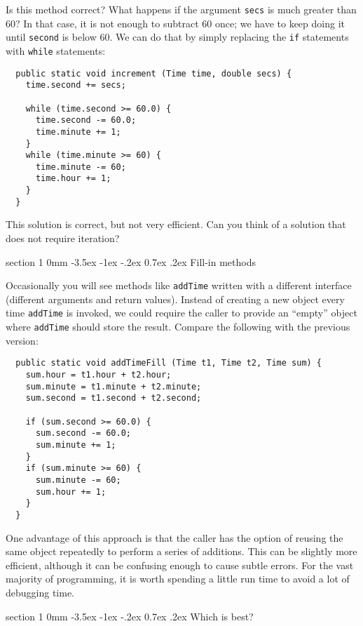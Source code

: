 \documentclass{book}
\makeatletter
\renewcommand{\section}{\@startsection 
    {section} {1} {0mm}%
    {-3.5ex \@plus -1ex \@minus -.2ex}%
    {0.7ex \@plus.2ex}%
    {\normalfont\Large\bfseries}}
\makeatother
\begin{document}
Is this method correct?  What happens if the argument {\tt secs}
is much greater than 60?  In that case, it is not enough to
subtract 60 once; we have to keep doing it until {\tt second}
is below 60.  We can do that by simply replacing the {\tt if}
statements with {\tt while} statements:

\begin{verbatim}
  public static void increment (Time time, double secs) {
    time.second += secs;

    while (time.second >= 60.0) {
      time.second -= 60.0;
      time.minute += 1;
    }
    while (time.minute >= 60) {
      time.minute -= 60;
      time.hour += 1;
    }
  }
\end{verbatim}
%
This solution is correct, but not very efficient.
Can you think of a solution that does not require iteration?

\section{Fill-in methods}

Occasionally you will see methods like {\tt addTime} written
with a different interface (different arguments and return values).
Instead of creating a new object every time {\tt addTime} is
invoked, we could require the caller to provide an ``empty''
object where {\tt addTime} should store the result.  Compare
the following with the previous version:

\begin{verbatim}
  public static void addTimeFill (Time t1, Time t2, Time sum) {
    sum.hour = t1.hour + t2.hour;
    sum.minute = t1.minute + t2.minute;
    sum.second = t1.second + t2.second;

    if (sum.second >= 60.0) {
      sum.second -= 60.0;
      sum.minute += 1;
    }
    if (sum.minute >= 60) {
      sum.minute -= 60;
      sum.hour += 1;
    }
  }
\end{verbatim}
%
One advantage of this approach is that the caller has the option
of reusing the same object repeatedly to perform a series
of additions.  This can be slightly more efficient, although
it can be confusing enough to cause subtle errors.
For the vast majority of programming, it is worth
spending a little run time to avoid a lot of debugging time.

\section{Which is best?}
\end{document}
